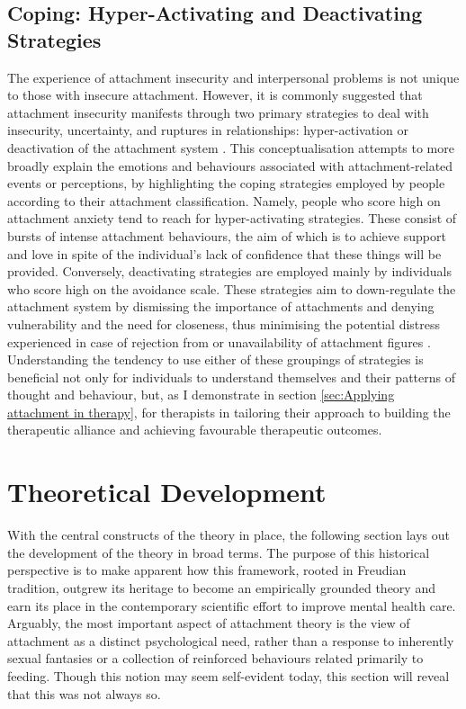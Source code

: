 \documentclass[12pt]{report}
\begin{document}
\subsection*{Coping: Hyper-Activating and Deactivating Strategies}
The experience of attachment insecurity and interpersonal problems is not unique to those with insecure attachment.
However, it is commonly suggested that attachment insecurity manifests through two primary strategies to deal with insecurity, uncertainty, and ruptures in relationships: hyper-activation or deactivation of the attachment system .
This conceptualisation attempts to more broadly explain the emotions and behaviours associated with attachment-related events or perceptions, by highlighting the coping strategies employed by people according to their attachment classification.
Namely, people who score high on attachment anxiety tend to reach for hyper-activating strategies.
These consist of bursts of intense attachment behaviours, the aim of which is to achieve support and love in spite of the individual's lack of confidence that these things will be provided.
Conversely, deactivating strategies are employed mainly by individuals who score high on the avoidance scale.
These strategies aim to down-regulate the attachment system by dismissing the importance of attachments and denying vulnerability and the need for closeness, thus minimising the potential distress experienced in case of rejection from or unavailability of attachment figures \cite{Mikulincer2003}.
Understanding the tendency to use either of these groupings of strategies is beneficial not only for individuals to understand themselves and their patterns of thought and behaviour, but, as I demonstrate in section \ref{sec:Applying attachment in therapy}, for therapists in tailoring their approach to building the therapeutic alliance and achieving favourable therapeutic outcomes.

\section{Theoretical Development}
With the central constructs of the theory in place, the following section lays out the development of the theory in broad terms.
The purpose of this historical perspective is to make apparent how this framework, rooted in Freudian tradition, outgrew its heritage to become an empirically grounded theory and earn its place in the contemporary scientific effort to improve mental health care.
Arguably, the most important aspect of attachment theory is the view of attachment as a distinct psychological need, rather than a response to inherently sexual fantasies or a collection of reinforced behaviours related primarily to feeding.
Though this notion may seem self-evident today, this section will reveal that this was not always so.
\end{document}
